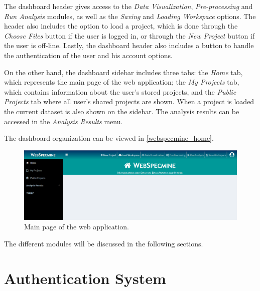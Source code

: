 The dashboard header gives access to the \textit{Data Visualization}, \textit{Pre-processing} and \textit{Run Analysis} modules, as well as the \textit{Saving} and \textit{Loading Workspace} options. The header also includes the option to load a project, which is done through the \textit{Choose Files} button if the user is logged in, or through the \textit{New Project} button if the user is off-line. Lastly, the dashboard header also includes a button to handle the authentication of the user and his account options. 

On the other hand, the dashboard sidebar includes three tabs: the \textit{Home} tab, which represents the main page of the web application; the \textit{My Projects} tab, which contains information about the user's stored projects, and the \textit{Public Projects} tab where all user's shared projects are shown. When a project is loaded the current dataset is also shown on the sidebar. The analysis results can be accessed in the \textit{Analysis Results} menu.

The dashboard organization can be viewed in \autoref{webspecmine_home}.

\begin{figure}[h]
	\centering
	\includegraphics[width=1\linewidth]{Imagens/webspecmine_home}
	\caption{Main page of the web application.}
	\label{webspecmine_home}
\end{figure}

The different modules will be discussed in the following sections.  


\section{Authentication System}


